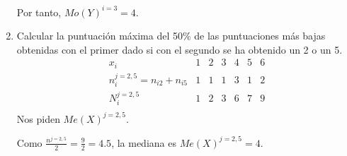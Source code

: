 \begin{ejercicio}
\begin{enumerate}
        Por tanto, $Mo(Y)^{i=3} = 4$.

        \item Calcular la puntuación máxima del 50\% de las puntuaciones más bajas obtenidas con el primer dado si con el segundo se ha obtenido un 2 o un 5.
        \begin{equation*}
            \begin{array}{c|cccccc}
                x_{i} & 1 & 2 & 3 & 4 & 5 & 6 \\ \hline
                n_{i}^{j=2,5} = n_{i2} + n_{i5} & 1 & 1 & 1 & 3 & 1 & 2 \\ \hline
                N_i^{j=2,5} & 1 & 2 & 3 & 6 & 7 & 9 \\
            \end{array}
        \end{equation*}
        Nos piden $Me(X)^{j=2,5}$.
        
        Como $\displaystyle \frac{n^{j=2,5}}{2}=\frac{9}{2}=4.5$, la mediana es $Me(X)^{j=2,5}=4$.
    \end{enumerate}
\end{ejercicio}

